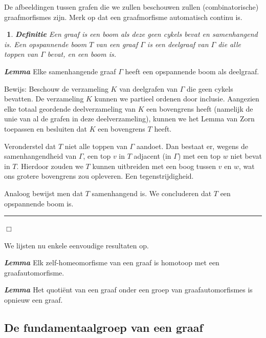 \documentclass[12pt]{book}
\newcommand{\bew}{{\sc Bewijs: }}
\newcommand{\B}{\rule{1mm}{0mm} \hfill $\Box$ }
\newenvironment{lem}{\begin{lemh}{\em {\bf Lemma }}}{\end{lemh}}
\newtheorem{dfh}[stelh]{$\!\!$}
\newenvironment{df}{\begin{dfh} \em {\bf Definitie }}{\end{dfh}}
\begin{document}
De afbeeldingen tussen grafen die we zullen beschouwen zullen (combinatorische) graafmorfismes zijn. Merk op dat een graafmorfisme automatisch continu is.

\begin{df}
Een graaf is een \emph{boom} als deze geen cykels bevat en samenhangend is. Een \emph{opspannende boom} $T$ van een graaf $\Gamma$ is een deelgraaf van $\Gamma$ die alle toppen van $\Gamma$ bevat, en een boom is.
\end{df}

\begin{lem}
Elke samenhangende graaf $\Gamma$ heeft een opspannende boom als deelgraaf.
\end{lem}
\bew
Beschouw de verzameling $K$ van deelgrafen van $\Gamma$ die geen cykels bevatten. De verzameling $K$ kunnen we partieel ordenen door inclusie. Aangezien elke totaal geordende deelverzameling van $K$ een bovengrens heeft (namelijk de unie van al de grafen in deze deelverzameling), kunnen we het Lemma van Zorn toepassen en besluiten dat $K$ een bovengrens $T$ heeft. 

Veronderstel dat $T$ niet alle toppen van $\Gamma$ aandoet. Dan bestaat er, wegens de samenhang\-endheid van $\Gamma$, een top $v$ in $T$ adjacent (in $\Gamma$) met een top $w$ niet bevat in $T$. Hierdoor zouden we $T$ kunnen uitbreiden met een boog tussen $v$ en $w$, wat ons grotere bovengrens zou opleveren. Een tegenstrijdigheid.

Analoog bewijst men dat $T$ samenhangend is. We concluderen dat $T$ een opspannende boom is.
\B




We lijsten nu enkele eenvoudige resultaten op.

\begin{lem}
Elk zelf-homeomorfisme van een graaf is homotoop met een graafautomorfisme.
\end{lem}

\begin{lem}
Het quoti\"ent van een graaf onder een groep van graafautomorfismes is opnieuw een graaf.
\end{lem}



\subsection{De fundamentaalgroep van een graaf}
\end{document}
